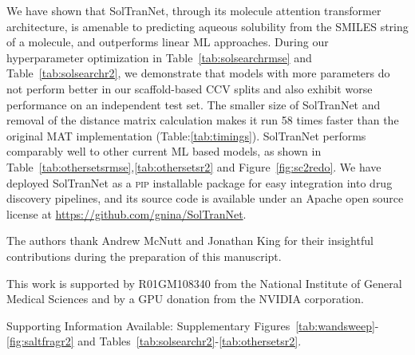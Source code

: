 \documentclass[journal=jmcmar,manuscript=article]{achemso}
\begin{document}
We have shown that SolTranNet, through its molecule attention transformer architecture, is amenable to predicting aqueous solubility from the SMILES string of a molecule, and outperforms linear ML approaches.
During our hyperparameter optimization in Table~\ref{tab:solsearchrmse} and Table~\ref{tab:solsearchr2}, we demonstrate that models with more parameters do not perform better in our scaffold-based CCV splits and also exhibit worse performance on an independent test set.
The smaller size of SolTranNet and removal of the distance matrix calculation makes it run 58 times faster than the original MAT implementation (Table:\ref{tab:timings}).
SolTranNet performs comparably well to other current ML based models, as shown in Table~\ref{tab:othersetsrmse},\ref{tab:othersetsr2} and Figure~\ref{fig:sc2redo}.
We have deployed SolTranNet as a \textsc{pip} installable package for easy integration into drug discovery pipelines, and its source code is available under an Apache open source license at \url{https://github.com/gnina/SolTranNet}.

\begin{acknowledgement}


The authors thank Andrew McNutt and Jonathan King for their insightful contributions during the preparation of this manuscript.

This work is supported by R01GM108340 from the National Institute of General Medical Sciences and by a GPU donation from the NVIDIA corporation.

\end{acknowledgement}

\begin{suppinfo}

Supporting Information Available: Supplementary Figures~\ref{tab:wandsweep}-\ref{fig:saltfragr2} and Tables~\ref{tab:solsearchr2}-\ref{tab:othersetsr2}.
\end{suppinfo}


\end{document}
